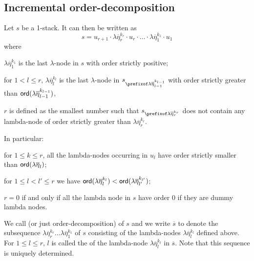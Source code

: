 \documentclass{article}
\theoremstyle{remark}
\theoremstyle{definition}
\newcommand\orddec\overline
\begin{document}
\subsection{Incremental order-decomposition}

Let $s$ be a 1-stack. It can then be written as
$$ s = u_{r+1} \cdot \lambda \overline{\eta}_r^{k_r} \cdot u_r \cdot
\ldots \cdot \lambda \overline{\eta}_1^{k_1} \cdot  u_1 $$
where
\begin{compactitem}
\item  $\lambda \overline{\eta}_1^{k_1}$ is the
last $\lambda$-node in $s$ with order strictly positive;

\item for $1 < l \leq r$, $\lambda
\overline{\eta}_l^{k_l}$ is the last $\lambda$-node in $s_{\prefixof
\lambda \overline{\eta}_{l-1}^{k_{l-1}}}$ with order strictly
greater than ${\sf ord}(\lambda \overline{\eta}_{l-1}^{k_{l-1}})$,

\item  $r$ is defined as the smallest number such that
$s_{\prefixof \lambda \overline{\eta}_{r}^{k_{r}}}$ does not contain
any lambda-node of order strictly greater than $\lambda
\overline{\eta}_{r}^{k_{r}}$.
\end{compactitem}

\noindent In particular:
\begin{compactitem}
\item for $1 \leq k \leq r$, all the lambda-nodes occurring in $u_l$ have order
strictly smaller than ${\sf ord}(\lambda \overline{\eta}_l)$;
\item for $1\leq l<l'\leq r$ we have ${\sf ord}(\lambda \overline{\eta}_l^{k_l})
< {\sf ord}(\lambda \overline{\eta}_{l'}^{k_{l'}})$;
\item $r=0$ if and only if all the lambda node in $s$ have order $0$ \ie if they are dummy lambda nodes.
\end{compactitem}
\smallskip

We call  (or just
order-decomposition) of $s$ and we write $\orddec{s}$ to denote the
subsequence $\lambda
\overline{\eta}_r^{k_r} \ldots \lambda\overline{\eta}_1^{k_1}$ of $s$ consisting of the lambda-nodes $\lambda
\overline{\eta}_l^{k_l}$ defined above. For $1\leq l \leq r$, $l$ is called the  of the lambda-node $\lambda \overline{\eta}_l^{k_l}$ in $\orddec{s}$.
 Note that this sequence is uniquely determined.
\end{document}
